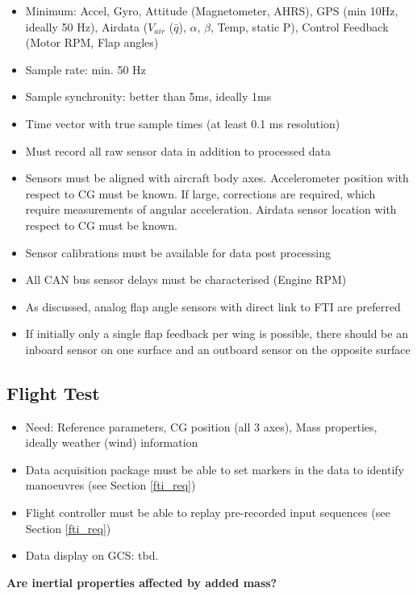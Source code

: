 \documentclass[11pt,a4paper]{article}
\begin{document}
\begin{itemize}
\item Minimum: Accel, Gyro, Attitude (Magnetometer, AHRS), GPS (min 10Hz, ideally 50 Hz), Airdata ($V_{air}$ ($\bar{q}$), $\alpha$, $\beta$, Temp, static P), Control Feedback (Motor RPM, Flap angles)
\item Sample rate: min. 50 Hz
\item Sample synchronity: better than 5ms, ideally 1ms
\item Time vector with true sample times (at least 0.1 ms resolution)
\item Must record all raw sensor data in addition to processed data 
\item Sensors must be aligned with aircraft body axes. Accelerometer position with respect to CG must be known. If large, corrections are required, which require measurements of angular acceleration. Airdata sensor location with respect to CG must be known.
\item Sensor calibrations must be available for data post processing
\item All CAN bus sensor delays must be characterised (Engine RPM)
\item As discussed, analog flap angle sensors with direct link to FTI are preferred
\item If initially only a single flap feedback per wing is possible, there should be an inboard sensor on one surface and an outboard sensor on the opposite surface
\end{itemize}


\subsection{Flight Test}

\begin{itemize}
\item Need: Reference parameters, CG position (all 3 axes), Mass properties, ideally weather (wind) information
\item Data acquisition package must be able to set markers in the data to identify manoeuvres (see Section \ref{fti_req})
\item Flight controller must be able to replay pre-recorded input sequences (see Section \ref{fti_req})
\item Data display on GCS: tbd.
\end{itemize}

\textbf{Are inertial properties affected by added mass?}
\end{document}
